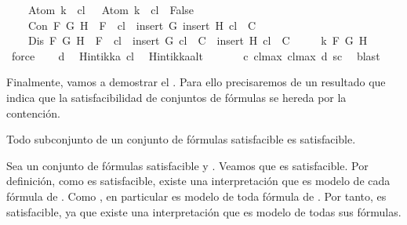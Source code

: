 \begin{isabellebody}
\ \ \ \ {\isachardoublequoteopen}Atom\ k\ {\isasymin}\ {\isacharquery}cl\ {\isasymLongrightarrow}\ \isactrlbold {\isasymnot}\ {\isacharparenleft}Atom\ k{\isacharparenright}\ {\isasymin}\ {\isacharquery}cl\ {\isasymLongrightarrow}\ False{\isachardoublequoteclose}\isanewline
\ \ \ \ {\isachardoublequoteopen}Con\ F\ G\ H\ {\isasymLongrightarrow}\ F\ {\isasymin}\ {\isacharquery}cl\ {\isasymLongrightarrow}\ insert\ G\ {\isacharparenleft}insert\ H\ {\isacharquery}cl{\isacharparenright}\ {\isasymin}\ C{\isachardoublequoteclose}\isanewline
\ \ \ \ {\isachardoublequoteopen}Dis\ F\ G\ H\ {\isasymLongrightarrow}\ F\ {\isasymin}\ {\isacharquery}cl\ {\isasymLongrightarrow}\ insert\ G\ {\isacharquery}cl\ {\isasymin}\ C\ {\isasymor}\ insert\ H\ {\isacharquery}cl\ {\isasymin}\ C{\isachardoublequoteclose}\isanewline
\ \ \ \ \ k\ F\ G\ H\ \isamarkupfalse%
\ force{\isacharplus}\isanewline
\ \ \isamarkupfalse%
\ d{\isacharparenleft}{}{\isacharcomma}{}{\isacharparenright}\ \isamarkupfalse%
\ {\isachardoublequoteopen}Hintikka\ {\isacharquery}cl{\isachardoublequoteclose}\ \isamarkupfalse%
\ Hintikka{\isacharunderscore}alt\ \isanewline
\ \ \ \ \isamarkupfalse%
\ c\ cl{\isacharunderscore}max\ cl{\isacharunderscore}max{\isacharprime}\ d{\isacharparenleft}{}{\isacharparenright}\ sc\ \isamarkupfalse%
\ blast\isanewline
{}\isamarkupfalse%
%
\endisatagproof
{\isafoldproof}%
%
\isadelimproof
%
\endisadelimproof
%
\begin{isamarkuptext}%
Finalmente, vamos a demostrar el . Para ello precisaremos de
  un resultado que indica que la satisfacibilidad de conjuntos de fórmulas se hereda por la 
  contención.

  \begin{lema}
    Todo subconjunto de un conjunto de fórmulas satisfacible es satisfacible.
  \end{lema}

  \begin{demostracion}
    Sea  un conjunto de fórmulas satisfacible y . Veamos que  es satisfacible.
    Por definición, como  es satisfacible, existe una interpretación \isa{{\isasymA}} que es modelo de cada 
    fórmula de . Como , en particular \isa{{\isasymA}} es modelo de toda fórmula de . Por tanto, 
     es satisfacible, ya que existe una interpretación que es modelo de todas sus fórmulas.
  \end{demostracion}


\end{isamarkuptext}
\end{isabellebody}
